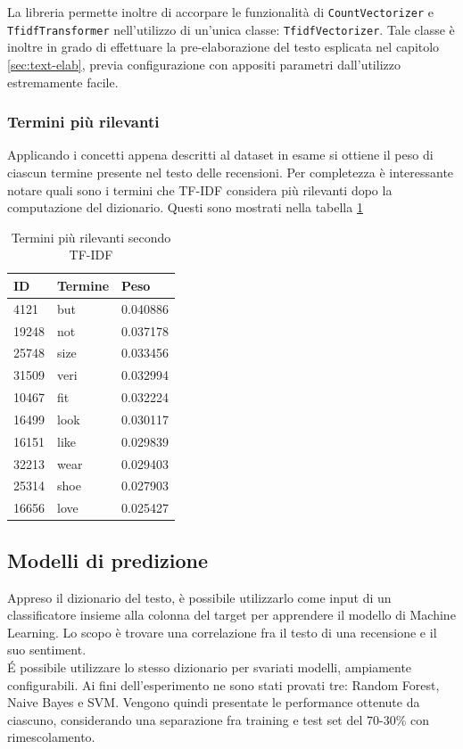 \documentclass[hidelinks, 12pt]{article}
\begin{document}
La libreria permette inoltre di accorpare le funzionalità di \texttt{CountVectorizer} e \texttt{TfidfTransformer} nell'utilizzo di un'unica classe: \texttt{TfidfVectorizer}. Tale classe è inoltre in grado di effettuare la pre-elaborazione del testo esplicata nel capitolo \ref{sec:text-elab}, previa configurazione con appositi parametri dall'utilizzo estremamente facile. 

\vspace{6ex}

\subsubsection{Termini più rilevanti}

Applicando i concetti appena descritti al dataset in esame si ottiene il peso di ciascun termine presente nel testo delle recensioni. Per completezza è interessante notare quali sono i termini che TF-IDF considera più rilevanti dopo la computazione del dizionario. Questi sono mostrati nella tabella \ref{tab:term-weights}

\begin{table}[H]
	\caption{Termini più rilevanti secondo TF-IDF}\label{tab:term-weights}
	\centering
	\begin{tabular}{|l|l|l|}
		\hline
		ID & Termine & Peso \\
		\hline
		4121 & but & 0.040886 \\ 
		19248 & not & 0.037178 \\ 
		25748 & size & 0.033456 \\ 
		31509 & veri & 0.032994 \\ 
		10467 & fit & 0.032224 \\ 
		16499 & look & 0.030117 \\ 
		16151 & like & 0.029839 \\ 
		32213 & wear & 0.029403 \\ 
		25314 & shoe & 0.027903 \\ 
		16656 & love & 0.025427 \\ 
		\hline
	\end{tabular}
\end{table}



\subsection{Modelli di predizione}

Appreso il dizionario del testo, è possibile utilizzarlo come input di un classificatore insieme alla colonna del target per apprendere il modello di Machine Learning. Lo scopo è trovare una correlazione fra il testo di una recensione e il suo sentiment. \\
É possibile utilizzare lo stesso dizionario per svariati modelli, ampiamente configurabili. Ai fini dell'esperimento ne sono stati provati tre: Random Forest, Naive Bayes e SVM. Vengono quindi presentate le performance ottenute da ciascuno, considerando una separazione fra training e test set del 70-30\% con rimescolamento.
\end{document}
